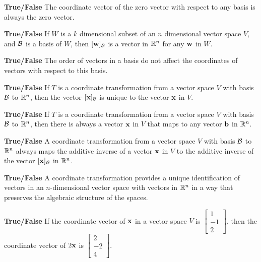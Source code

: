 \item \textbf{True/False} The coordinate vector of the zero vector with respect to any basis is always the zero vector.

\item \textbf{True/False} If $W$ is a $k$ dimensional subset of an $n$ dimensional vector space $V$, and $\mathcal{B}$ is a basis of $W$, then $[\mathbf{w}]_{\mathcal{B}}$ is a vector in $\mathbb{R}^n$ for any $\mathbf{w}$ in $W$.

\item \textbf{True/False} The order of vectors in a basis do not affect the coordinates of vectors with respect to this basis.

\item \textbf{True/False} If $T$ is a coordinate transformation from a vector space $V$ with basis $\mathcal{B}$ to $\mathbb{R}^n$, then the vector $[\mathbf{x}]_{\mathcal{B}}$ is unique to the vector $\mathbf{x}$ in $V$. 

\item \textbf{True/False}  If $T$ is a coordinate transformation from a vector space $V$ with basis $\mathcal{B}$ to $\mathbb{R}^n$, then there is always a vector $\mathbf{x}$ in $V$ that maps to any vector $\mathbf{b}$ in $\mathbb{R}^n$. 

\item \textbf{True/False}  A coordinate transformation from a vector space $V$ with basis $\mathcal{B}$ to $\mathbb{R}^n$ always maps the additive inverse of a vector $\mathbf{x}$ in $V$ to the additive inverse of the vector $[\mathbf{x}]_{\mathcal{B}}$ in $\mathbb{R}^n$. 

\item \textbf{True/False} A coordinate transformation provides a unique identification of vectors in an $n$-dimensional vector space with vectors in $\mathbb{R}^n$ in a way that preserves the algebraic structure of the spaces.  

\item \textbf{True/False} If the coordinate vector of $\mathbf{x}$ in a vector space $V$ is $\left[ \begin{array}{r} 1\\-1\\2 \end{array} \right]$, then the coordinate vector of $2\mathbf{x}$ is $\left[ \begin{array}{r} 2\\-2\\4 \end{array} \right]$.


\ea


\ee


